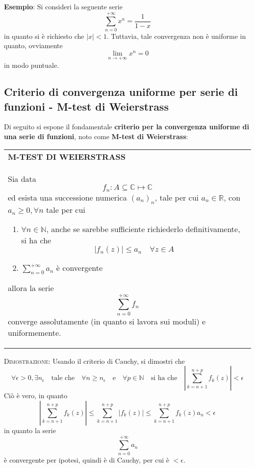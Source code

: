\documentclass[a4paper]{extarticle}
\renewcommand\arraystretch{}
\begin{document}
\vspace{2em}
\noindent
\textbf{Esempio}: Si consideri la seguente serie
\[\sum_{n=0}^{+\infty} x^n = \frac{1}{1-x}\]
in quanto si è richiesto che $\vert x \vert < 1$. Tuttavia, tale convergenza non è uniforme in quanto, ovviamente
\[\lim_{n \to +\infty} x^n = 0\]
in modo puntuale.

\vspace{1em}
\subsection{Criterio di convergenza uniforme per serie di funzioni - M-test di Weierstrass}
Di seguito si espone il fondamentale \textbf{criterio per la convergenza uniforme di una serie di funzioni}, noto come \textbf{M-test di Weierstrass}:

\vspace{1em}
\setlength{\tabcolsep}{14pt}
\renewcommand{\arraystretch}{2}
\noindent
\begin{tabularx}{\textwidth}{@{}|P|@{}}
    \hline
    {\textbf{M-TEST DI WEIERSTRASS}}\\
    \parbox{\linewidth}{Sia data
    \[f_n : A \subseteq \mathbb{C} \longmapsto \mathbb{C}\]
    ed esista una successione numerica $(a_n)_n$, tale per cui $a_n \in \mathbb{R}$, con $a_n \geq 0, \forall n$ tale per cui
    \begin{enumerate}
        \item $\forall n \in \mathbb{N}$, anche se sarebbe sufficiente richiederlo definitivamente, si ha che
        \[\vert f_n(z) \vert \leq a_n \hspace{1em} \forall z \in A\]
        \item $\displaystyle{\sum_{n=0}^{+\infty} a_n}$ è convergente
    \end{enumerate}
    allora la serie
    \[\sum_{n=0}^{+\infty} f_n\]
    converge assolutamente (in quanto si lavora sui moduli) e uniformemente.\vspace{3mm}}\\
    \hline
\end{tabularx}

\newpage
\noindent
\normalfont \normalsize
\textsc{Dimostrazione}: Usando il criterio di Cauchy, si dimostri che
\[\forall \epsilon > 0, \exists n_\epsilon \hspace{1em} \text{tale che} \hspace{1em} \forall n \geq n_\epsilon \hspace{1em} \text{e} \hspace{1em} \forall p \in \mathbb{N} \hspace{1em} \text{si ha che} \hspace{1em} \left \vert \sum_{k=n+1}^{n+p} f_k(z) \right \vert < \epsilon\]
Ciò è vero, in quanto
\[\left \vert \sum_{k=n+1}^{n+p} f_k(z) \right \vert \leq \sum_{k=n+1}^{n+p} \left \vert f_k(z) \right \vert \leq \sum_{k=n+1}^{n+p} f_k(z) a_n < \epsilon\]
in quanto la serie
\[\displaystyle{\sum_{n=0}^{+\infty} a_n}\]
è convergente per ipotesi, quindi è di Cauchy, per cui è $< \epsilon$.
\end{document}
